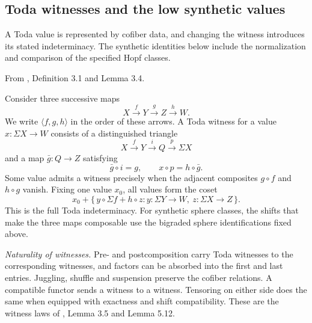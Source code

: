 \subsection{Toda witnesses and the low synthetic values}
A Toda value is represented by cofiber data, and changing the witness
introduces its stated indeterminacy. The synthetic identities below
include the normalization and comparison of the specified Hopf classes.

\begin{definition}
\label{sem:Literature:toda-relations}
\label{sem:Literature:toda-functoriality}
From \cite{ChristensenFrankland2017}, Definition 3.1 and Lemma 3.4.\par

Consider three successive maps
\[
 X\xrightarrow fY\xrightarrow gZ\xrightarrow hW.
\]
We write $\langle f,g,h\rangle$ in the order of these arrows.
A Toda witness for a value $x:\Sigma X\to W$ consists of a
distinguished triangle
\[
 X\xrightarrow fY\xrightarrow iQ\xrightarrow p\Sigma X
\]
and a map $\bar g:Q\to Z$ satisfying
\[
 \bar g\circ i=g,\qquad x\circ p=h\circ\bar g.
\]
Some value admits a witness precisely when the adjacent composites
$g\circ f$ and $h\circ g$ vanish. Fixing one value $x_0$, all values
form the coset
\[
 x_0+\{\,y\circ\Sigma f+h\circ z:
       y:\Sigma Y\to W,\ z:\Sigma X\to Z\,\}.
\]
This is the full Toda indeterminacy. For synthetic sphere classes,
the shifts that make the three maps composable use the bigraded sphere
identifications fixed above.

\emph{Naturality of witnesses.} Pre- and postcomposition carry Toda
witnesses to the corresponding witnesses, and factors can be absorbed
into the first and last entries. Juggling, shuffle and suspension
preserve the cofiber relations. A compatible functor sends a witness to
a witness. Tensoring on either side does the same when equipped with
exactness and shift compatibility. These are the witness laws of
\cite{ChristensenFrankland2017}, Lemma 3.5 and Lemma 5.12.

\end{definition}
